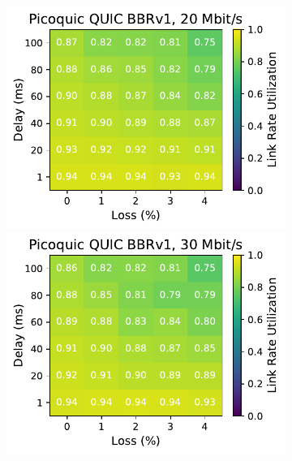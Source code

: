 \begin{figure}[ht]
\begin{subfigure}[b]{0.22\linewidth}
        \includegraphics[width=\linewidth,trim={0 0 2cm 0},clip]{splitting/figures/heatmaps/heatmap_picoquic_bbr1_20mbps.pdf}
        \includegraphics[width=\linewidth,trim={0 0 2cm 0},clip]{splitting/figures/heatmaps/heatmap_picoquic_bbr1_30mbps.pdf}

\end{subfigure}
\end{figure}
